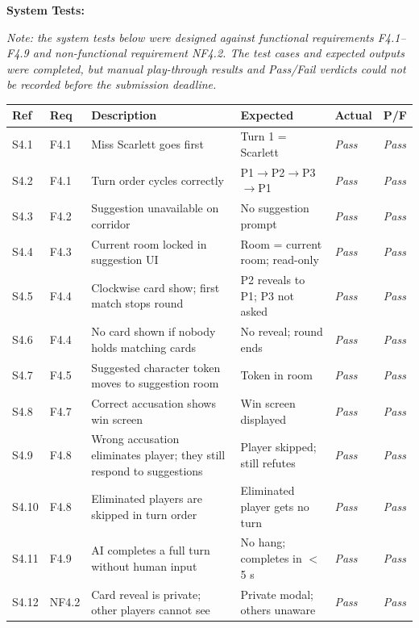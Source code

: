 \textbf{System Tests:}

\noindent\textit{Note: the system tests below were designed against functional requirements F4.1--F4.9 and non-functional requirement NF4.2. The test cases and expected outputs were completed, but manual play-through results and Pass/Fail verdicts could not be recorded before the submission deadline.}
\begin{table}[H]
\centering
\footnotesize
\begin{tabular}{|l|l|p{3.8cm}|p{2.8cm}|p{2.8cm}|l|}
\hline
\textbf{Ref} & \textbf{Req} & \textbf{Description} & \textbf{Expected} & \textbf{Actual} & \textbf{P/F} \\ \hline
S4.1 & F4.1 & Miss Scarlett goes first & Turn 1 = Scarlett & \textit{Pass} & \textit{Pass} \\ \hline
S4.2 & F4.1 & Turn order cycles correctly & P1$\to$P2$\to$P3$\to$P1 & \textit{Pass} & \textit{Pass} \\ \hline
S4.3 & F4.2 & Suggestion unavailable on corridor & No suggestion prompt & \textit{Pass} & \textit{Pass} \\ \hline
S4.4 & F4.3 & Current room locked in suggestion UI & Room = current room; read-only & \textit{Pass} & \textit{Pass} \\ \hline
S4.5 & F4.4 & Clockwise card show; first match stops round & P2 reveals to P1; P3 not asked & \textit{Pass} & \textit{Pass} \\ \hline
S4.6 & F4.4 & No card shown if nobody holds matching cards & No reveal; round ends & \textit{Pass} & \textit{Pass} \\ \hline
S4.7 & F4.5 & Suggested character token moves to suggestion room & Token in room & \textit{Pass} & \textit{Pass} \\ \hline
S4.8 & F4.7 & Correct accusation shows win screen & Win screen displayed & \textit{Pass} & \textit{Pass} \\ \hline
S4.9 & F4.8 & Wrong accusation eliminates player; they still respond to suggestions & Player skipped; still refutes & \textit{Pass} & \textit{Pass} \\ \hline
S4.10 & F4.8 & Eliminated players are skipped in turn order & Eliminated player gets no turn & \textit{Pass} & \textit{Pass} \\ \hline
S4.11 & F4.9 & AI completes a full turn without human input & No hang; completes in $<$5 s & \textit{Pass} & \textit{Pass} \\ \hline
S4.12 & NF4.2 & Card reveal is private; other players cannot see & Private modal; others unaware & \textit{Pass} & \textit{Pass} \\ \hline
\end{tabular}
\end{table}

